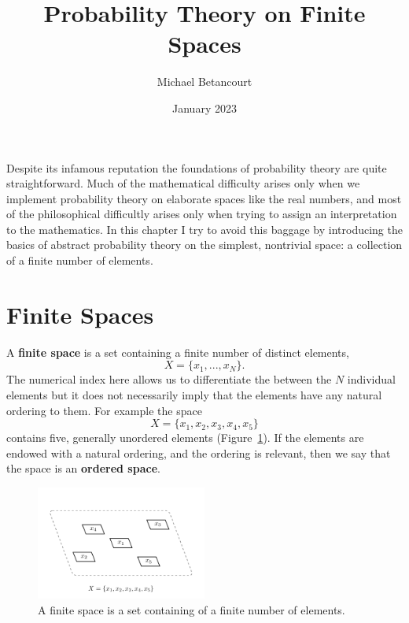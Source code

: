 \documentclass[
  letterpaper,
  DIV=11,
  numbers=noendperiod]{scrartcl}
\title{Probability Theory on Finite Spaces}
\author{Michael Betancourt}
\date{January 2023}
\renewcommand*\contentsname{Table of contents}
\newcommand\contentsname{Table of contents}
\begin{document}
\maketitle
\ifdefined\Shaded\renewenvironment{Shaded}{\begin{tcolorbox}[interior hidden, borderline west={3pt}{0pt}{shadecolor}, sharp corners, breakable, enhanced, boxrule=0pt, frame hidden]}{\end{tcolorbox}}\fi

\renewcommand*\contentsname{Table of contents}
{
\hypersetup{linkcolor=}
\setcounter{tocdepth}{3}
\tableofcontents
}
Despite its infamous reputation the foundations of probability theory
are quite straightforward. Much of the mathematical difficulty arises
only when we implement probability theory on elaborate spaces like the
real numbers, and most of the philosophical difficultly arises only when
trying to assign an interpretation to the mathematics. In this chapter I
try to avoid this baggage by introducing the basics of abstract
probability theory on the simplest, nontrivial space: a collection of a
finite number of elements.

\hypertarget{finite-spaces}{%
\section{Finite Spaces}\label{finite-spaces}}

A \textbf{finite space} is a set containing a finite number of distinct
elements, \[
X = \{x_1, ..., x_N\}.
\] The numerical index here allows us to differentiate the between the
\(N\) individual elements but it does not necessarily imply that the
elements have any natural ordering to them. For example the space \[
X = \{x_1, x_2, x_3, x_4, x_5\}
\] contains five, generally unordered elements
(Figure~\ref{fig-ambient_space}). If the elements are endowed with a
natural ordering, and the ordering is relevant, then we say that the
space is an \textbf{ordered space}.

\begin{figure}

{\centering \includegraphics[width=0.5\textwidth,height=\textheight]{figures/ambient_space/ambient_space.pdf}

}

\caption{\label{fig-ambient_space}A finite space is a set containing of
a finite number of elements.}

\end{figure}
\end{document}
